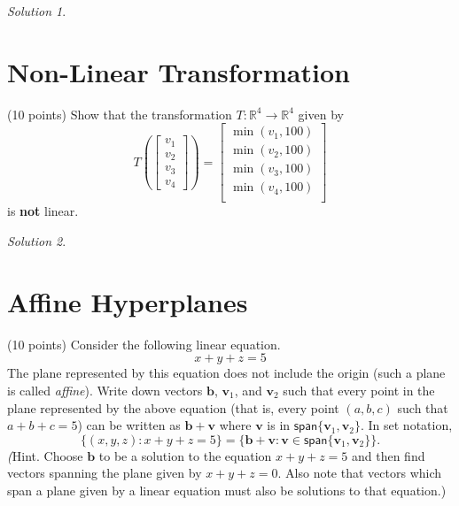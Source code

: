 \documentclass{article}
\theoremstyle{remark}
\newtheorem*{solution}{Solution}
\begin{document}
\begin{solution}
\end{solution}

\pagebreak
\section{Non-Linear Transformation}
(10 points) Show that the transformation $T: \mathbb R^4 \to \mathbb R^4$ given by
\begin{displaymath}
  T\left(
  \begin{bmatrix}
    v_1 \\ v_2 \\ v_3 \\ v_4
  \end{bmatrix}
  \right)
  =
  \begin{bmatrix}
    \min(v_1, 100) \\
    \min(v_2, 100) \\
    \min(v_3, 100) \\
    \min(v_4, 100) \\
  \end{bmatrix}
\end{displaymath}
is \textbf{not} linear.

\medskip

\begin{solution}
\end{solution}

\pagebreak
\section{Affine Hyperplanes}
(10 points) Consider the following linear equation.
\begin{displaymath}
  x + y + z = 5
\end{displaymath}
The plane represented by this equation does not include the origin (such a plane is called \textit{affine}).
Write down vectors $\mathbf b$, $\mathbf v_1$, and $\mathbf v_2$ such that every point in the plane represented by the above equation (that is, every point $(a, b, c)$ such that $a + b + c = 5$) can be written as $\mathbf b + \mathbf v$ where $\mathbf v$ is in $\mathsf{span} \{\mathbf v_1, \mathbf v_2\}$. In set notation,
\begin{displaymath}
  \{(x, y, z) : x + y + z = 5\} = \{\mathbf b + \mathbf v : \mathbf v \in \mathsf{span}\{\mathbf v_1, \mathbf v_2\}\}.
\end{displaymath}
\textit(Hint. Choose $\mathbf b$ to be a solution to the equation $x + y + z = 5$ and then find vectors spanning the plane given by $x + y + z = 0$. Also note that
vectors which span a plane given by a linear equation must also be solutions to that equation.)
\end{document}
